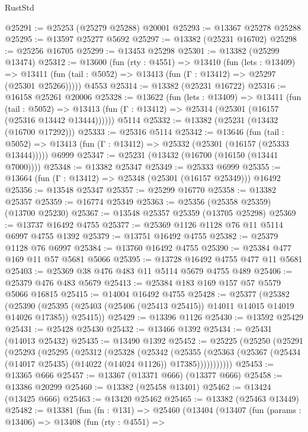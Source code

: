 \begin{lexlean}{RustStd}
\begin{coremodule}
@25291 := @25253 (@25279 @25288) @20001
@25293 := @13367 @25278 @25288
@25295 := @13597 @25277 @5692
@25297 := @13382 (@25231 @16702)
@25298 := @25256 @16705
@25299 := @13453 @25298
@25301 := @13382 (@25299 @13474)
@25312 := @13600
    (fun (rty : @4551) =>
    @13410
      (fun (lets : @13409) =>
      @13411 (fun (tail : @5052) => @13413 (fun (Γ : @13412) => @25297 (@25301 @25266)))))
    @4553
@25314 := @13382 (@25231 @16722)
@25316 := @16158 @25261 @20006
@25328 := @13622
    (fun (lets : @13409) =>
    @13411
      (fun (tail : @5052) =>
      @13413 (fun (Γ : @13412) => @25314 (@25301 (@16157 (@25316 @13442 @13444))))))
    @5114
@25332 := @13382 (@25231 (@13432 (@16700 @17292)))
@25333 := @25316 @5114
@25342 := @13646
    (fun (tail : @5052) => @13413 (fun (Γ : @13412) => @25332 (@25301 (@16157 (@25333 @13444)))))
    @6999
@25347 := @25231 (@13432 (@16700 (@16150 (@13441 @7000))))
@25348 := @13382 @25347
@25349 := @25333 @6999
@25355 := @13664 (fun (Γ : @13412) => @25348 (@25301 (@16157 @25349))) @16492
@25356 := @13548 @25347
@25357 := @25299 @16770
@25358 := @13382 @25357
@25359 := @16774 @25349
@25363 := @25356 (@25358 @25359) (@13700 @25230)
@25367 := @13548 @25357 @25359 (@13705 @25298)
@25369 := @13737 @16492 @4755
@25377 := @25369 @1126 @1128 @76 @11 @5114 @6997 @4755 @1392
@25379 := @13751 @16492 @4755
@25382 := @25379 @1128 @76 @6997
@25384 := @13760 @16492 @4755
@25390 := @25384 @477 @169 @11 @57 @5681 @5066
@25395 := @13728 @16492 @4755 @477 @11 @5681
@25403 := @25369 @38 @476 @483 @11 @5114 @5679 @4755 @489
@25406 := @25379 @476 @483 @5679
@25413 := @25384 @183 @169 @157 @57 @5579 @5066 @16815
@25415 := @14004 @16492 @4755
@25428 := @25377
    (@25382
      (@25390 (@25395 (@25403 (@25406 (@25413 @25415)) @14011 @14015 @14019 @14026 @17385)) @25415))
@25429 := @13396 @1126
@25430 := @13592 @25429
@25431 := @25428 @25430
@25432 := @13466 @1392
@25434 := @25431 (@14013 @25432)
@25435 := @13490 @1392
@25452 := @25225
    (@25250
      (@25291
        (@25293
          (@25295
            (@25312
              (@25328
                (@25342
                  (@25355
                    (@25363
                      (@25367 (@25434 (@14017 @25435) (@14022 (@14024 @1126)) @17385)))))))))))
@25453 := @13365 @666
@25457 := @13367 (@13371 @666) (@13377 @666)
@25458 := @13386 @20299
@25460 := @13382 (@25458 @13401)
@25462 := @13424 (@13425 @666)
@25463 := @13420 @25462
@25465 := @13382 (@25463 @13449)
@25482 := @13381
    (fun (fn : @131) =>
    @25460
      (@13404
        (@13407
          (fun (params : @13406) =>
          @13408
            (fun (rty : @4551) =>

\end{coremodule}
\end{lexlean}
